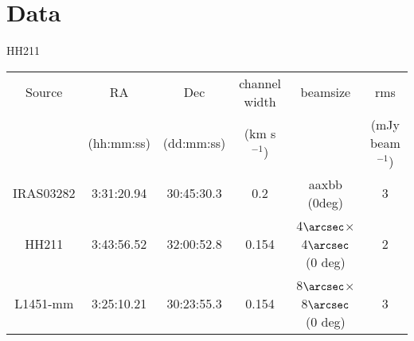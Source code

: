 \section{Data}

HH211

\cite{Tanner_2010}
\cite{Pineda_2011}
\cite{Tobin_2011}

\begin{table} 
    \begin{tabular}{ c c c c c c }
        Source & RA & Dec & channel width & beamsize & rms \\ 
         & (hh:mm:ss) & (dd:mm:ss) & (km s$^{-1}$) &  & (mJy beam$^{-1}$) \\ 
        IRAS03282 & 3:31:20.94 & 30:45:30.3 & 0.2 & aaxbb (0deg) & 3 \\ 
        HH211 & 3:43:56.52 & 32:00:52.8 & 0.154 & 4$\arcsec$$\times$4$\arcsec$ (0 deg) & 2 \\ 
        L1451-mm & 3:25:10.21 & 30:23:55.3 & 0.154 & 8$\arcsec$$\times$8$\arcsec$ (0 deg) & 3 \\ 
    \end{tabular} 
\end{table}